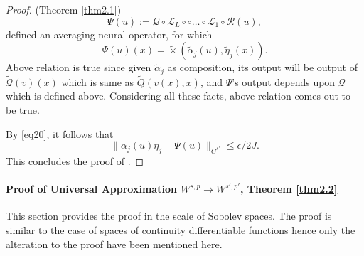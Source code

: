 \documentclass[reqno,9pt]{amsart}
\theoremstyle{plain}
\theoremstyle{definition}
\newcommand{\cal}[1]{\mathcal{#1}}
\begin{document}
\begin{proof}{(Theorem \ref{thm2.1})}
$$ \Psi(u) := \cal Q \circ \cal L_L\circ \circ \dots \circ \cal L_1 \circ \cal R(u),$$
defined an averaging neural operator, for which
$$ \Psi(u)(x) = \tilde{\times}(\tilde{\alpha}_j(u),\tilde{\eta}_j(x)).$$
Above relation is true since given $\tilde{\alpha}_j$ as composition, its output will be output of $\tilde{\cal Q}(v)(x)$ which is same as $\tilde{Q}(v(x),x)$, and $\Psi$'s output depends upon $\cal Q$ which is defined above. Considering all these facts, above relation comes out to be true.

\noindent By \ref{eq20}, it follows that 
$$ \|\alpha_j(u)\eta_j - \Psi(u)\|_{C^{s'}} \leq \epsilon/2J.$$
This concludes the proof of .
\end{proof}

\paragraph{\bf Proof of Universal Approximation $W^{s,p} \to W^{s',p'}$, Theorem \ref{thm2.2}}
This section provides the proof in the scale of Sobolev spaces. The proof is similar to the case of spaces of continuity differentiable functions hence only the alteration to the proof have been mentioned here.
\end{document}
